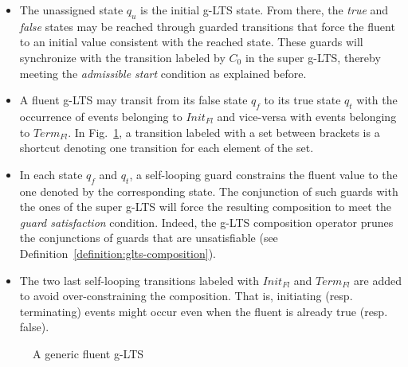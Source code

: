 \begin{itemize}
\item The unassigned state $q_u$ is the initial g-LTS state. From there, the \emph{true} and \emph{false} states may be reached through guarded transitions that force the fluent to an initial value consistent with the reached state. These guards will synchronize with the transition labeled by $C_0$ in the super g-LTS, thereby meeting the \emph{admissible start} condition as explained before.
\item A fluent g-LTS may transit from its false state $q_f$ to its true state $q_t$ with the occurrence of events belonging to $Init_{Fl}$ and vice-versa with events belonging to $Term_{Fl}$. In Fig.~\ref{image:fluent-glts}, a transition labeled with a set between brackets is a shortcut denoting one transition for each element of the set.
\item In each state $q_f$ and $q_t$, a self-looping guard constrains the fluent value to the one denoted by the corresponding state. The conjunction of such guards with the ones of the super g-LTS will force the resulting composition to meet the \emph{guard satisfaction} condition. Indeed, the g-LTS composition operator prunes the conjunctions of guards that are unsatisfiable (see Definition~\ref{definition:glts-composition}).
\item The two last self-looping transitions labeled with $Init_{Fl}$ and $Term_{Fl}$ are added to avoid over-constraining the composition. That is, initiating (resp. terminating) events might occur even when the fluent is already true (resp. false).
\end{itemize}

\begin{figure}\centering
{}
\caption{A generic fluent g-LTS\label{image:fluent-glts}}
\end{figure}

